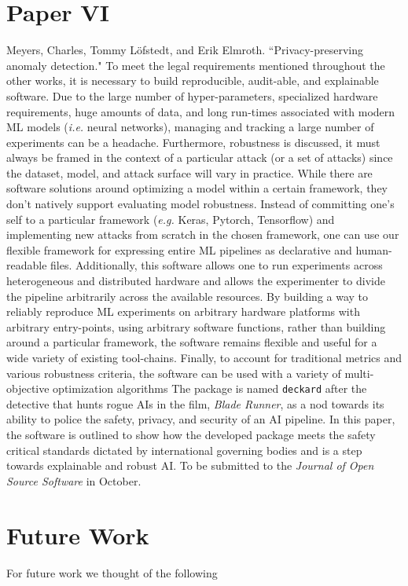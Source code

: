 \section{Paper VI}
Meyers, Charles, Tommy Löfstedt, and Erik Elmroth. “Privacy-preserving anomaly detection."
To meet the legal requirements mentioned throughout the other works, it is necessary to build reproducible, audit-able, and explainable software. 
Due to the large number of hyper-parameters, specialized hardware requirements, huge amounts of data, and long run-times associated with modern ML models (\textit{i.e.} neural networks), managing and tracking a large number of experiments can be a headache. 
Furthermore, robustness is discussed, it must always be framed in the context of a particular attack (or a set of attacks) since the dataset, model, and attack surface will vary in practice. 
While there are software solutions around optimizing a model within a certain framework, they don't natively support evaluating model robustness. Instead of committing one's self to a particular framework (\textit{e.g.} Keras, Pytorch, Tensorflow) and implementing new attacks from scratch in the chosen framework, one can use our flexible framework for expressing entire ML pipelines as declarative and human-readable files. 
Additionally, this software allows one to run experiments across heterogeneous and distributed hardware and allows the experimenter to divide the pipeline arbitrarily across the available resources.
By building a way to reliably reproduce ML experiments on arbitrary hardware platforms with arbitrary entry-points, using arbitrary software functions, rather than building around a particular framework, the software remains flexible and useful for a wide variety of existing tool-chains.
Finally, to account for traditional metrics and various robustness criteria, the software can be used with a variety of multi-objective optimization algorithms
The package is named \texttt{deckard} after the detective that hunts rogue AIs in the film, \textit{Blade Runner}, as a nod towards its ability to police the safety, privacy, and security of an AI pipeline. 
In this paper, the software is outlined to show how the developed package meets the safety critical standards dictated by international governing bodies and is a step towards explainable and robust AI.
To be submitted to the \textit{Journal of Open Source Software} in October.


\section{Future Work}
For future work we thought of the following \lipsum[1-3]